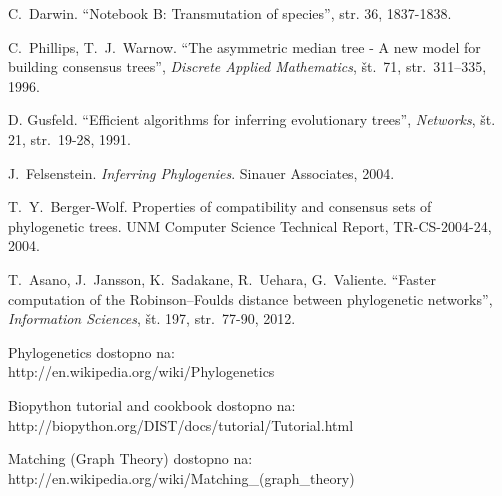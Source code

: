 \documentclass[a4paper, 12pt]{book}
\begin{document}
\begin{thebibliography}{99}

C.\ Darwin. ``Notebook B: Transmutation of species'', str. 36, 1837-1838.

C.\ Phillips, T.\ J.\ Warnow. ``The asymmetric median tree - A new model for building consensus trees'', {\it Discrete Applied Mathematics}, št.\ 71, str.\ 311–335, 1996.

D. Gusfeld. ``Efficient algorithms for inferring evolutionary trees'', {\it Networks}, št. 21, str.\ 19-28, 1991.

J.\ Felsenstein. \textit{Inferring Phylogenies}. Sinauer Associates, 2004.

T.\ Y.\ Berger-Wolf. Properties of compatibility and consensus sets of phylogenetic trees. UNM Computer Science Technical Report, TR-CS-2004-24, 2004.

T.\ Asano, J.\ Jansson, K.\ Sadakane, R.\ Uehara, G.\ Valiente. ``Faster computation of the Robinson–Foulds distance between phylogenetic networks'', {\it Information Sciences}, št. 197, str.\ 77-90, 2012.

Phylogenetics
dostopno na:\\ http://en.wikipedia.org/wiki/Phylogenetics

Biopython tutorial and cookbook
dostopno na: \\ http://biopython.org/DIST/docs/tutorial/Tutorial.html

Matching (Graph Theory)
dostopno na: \\ http://en.wikipedia.org/wiki/Matching\_(graph\_theory)


\end{thebibliography}
\end{document}
